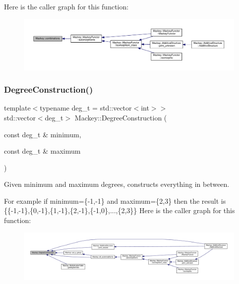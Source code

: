 Here is the caller graph for this function\+:\nopagebreak
\begin{figure}[H]
\begin{center}
\leavevmode
\includegraphics[width=350pt]{namespaceMackey_a3a4b7761ed7274b145eed9a451b53e61_icgraph}
\end{center}
\end{figure}
\mbox{\label{namespaceMackey_a49fef6f64b67ff118d35ac45b9c92972}} 
\subsubsection{\texorpdfstring{Degree\+Construction()}{DegreeConstruction()}}
{\footnotesize\ttfamily template$<$typename deg\+\_\+t  = std\+::vector$<$int$>$$>$ \\
std\+::vector$<$deg\+\_\+t$>$ Mackey\+::\+Degree\+Construction (\begin{DoxyParamCaption}\item[{const deg\+\_\+t \&}]{minimum,  }\item[{const deg\+\_\+t \&}]{maximum }\end{DoxyParamCaption})}



Given minimum and maximum degrees, constructs everything in between. 

For example if minimum=\{-\/1,-\/1\} and maximum=\{2,3\} then the result is \{\{-\/1,-\/1\},\{0,-\/1\},\{1,-\/1\},\{2,-\/1\},\{-\/1,0\},...,\{2,3\}\} Here is the caller graph for this function\+:\nopagebreak
\begin{figure}[H]
\begin{center}
\leavevmode
\includegraphics[width=350pt]{namespaceMackey_a49fef6f64b67ff118d35ac45b9c92972_icgraph}
\end{center}
\end{figure}
\mbox{\label{namespaceMackey_a276ffc8b4c9c52cfde39cd3da3c88cc9}} 
